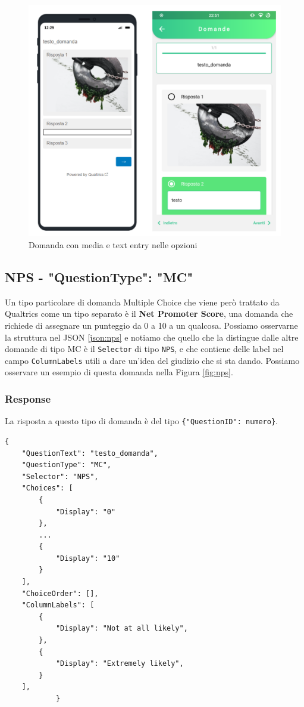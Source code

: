 \begin{figure}[ht!]
\centering
\includegraphics[width=\textwidth]{img/mc_media}
\caption{Domanda con media e text entry nelle opzioni}
\label{fig:mc_media}
\end{figure}

\clearpage
\subsection{NPS - "QuestionType": "MC"}
Un tipo particolare di domanda Multiple Choice che viene però trattato da Qualtrics come un tipo separato è il \textbf{Net Promoter Score}, una domanda che richiede di assegnare un punteggio da 0 a 10 a un qualcosa. Possiamo osservarne la struttura nel JSON \ref{json:nps} e notiamo che quello che la distingue dalle altre domande di tipo MC è il \texttt{Selector} di tipo \texttt{NPS}, e che contiene delle label nel campo \texttt{ColumnLabels} utili a dare un'idea del giudizio che si sta dando. Possiamo osservare un esempio di questa domanda nella Figura \ref{fig:nps}.

\subsubsection{Response}
La risposta a questo tipo di domanda è del tipo \texttt{\{"QuestionID": numero\}}.

\begin{json}
\begin{verbatim}
{
    "QuestionText": "testo_domanda",
    "QuestionType": "MC",
    "Selector": "NPS",
    "Choices": [
        {
            "Display": "0"
        },
        ...
        {
            "Display": "10"
        }
    ],
    "ChoiceOrder": [],
    "ColumnLabels": [
        {
            "Display": "Not at all likely",
        },
        {
            "Display": "Extremely likely",
        }
    ],
            }
\end{verbatim}
\caption{Oggetto domanda NPS}
\label{json:nps}
\end{json}

